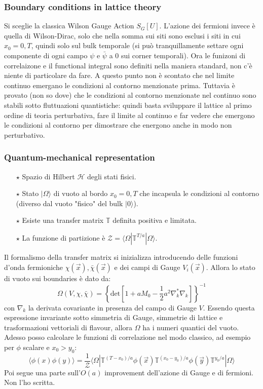 \documentclass[12pt,a4paper,openright]{article}
\newcommand{\la}{\langle}
\newcommand{\ra}{\rangle}
\newcommand{\colg}{\textcolor{PineGreen}}
\begin{document}
\subsubsection*{Boundary conditions in lattice theory}
Si sceglie la classica Wilson Gauge Action $S_G[U]$. L'azione dei fermioni invece è quella di Wilson-Dirac, solo che nella somma sui siti sono esclusi i siti in cui $x_0 = 0, T$, quindi solo sul bulk temporale
(si può tranquillamente settare ogni componente di ogni campo $\psi$ e $\bar\psi$ a 0 sui corner temporali).
Ora \colg{le funizoni di correlaizone e il functional integral sono definiti nella maniera standard, non c'è niente di particolare da fare}.
\newline
A questo punto non è scontato che nel limite continuo emergano le condizioni al contorno menzionate prima.
Tuttavia è provato (non so dove) che le condizioni al contorno menzionate nel continuo sono stabili sotto fluttuazioni quantistiche: quindi basta sviluppare il lattice al primo ordine di teoria perturbativa, fare il limite al continuo e far vedere che emergono le condizioni al contorno per dimostrare che energono anche in modo non perturbativo.

\subsubsection*{Quantum-mechanical representation}
\begin{itemize}
  \item [$\star$] Spazio di Hilbert $\mathcal{H}$ degli stati fisici.
  \item [$\star$] Stato $| \Omega \ra$ di vuoto al bordo $x_0 = 0,T$ che incapsula le condizioni al contorno (diverso dal vuoto "fisico" del bulk $| 0 \ra$).
  \item [$\star$] Esiste una transfer matrix $\mathbb{T}$ definita positiva e limitata.
  \item [$\star$] La funzione di partizione è $\mathcal{Z} = \la \Omega | \mathbb{T}^{T/a} | \Omega \ra$.
\end{itemize}
Il formalismo della transfer matrix si inizializza introducendo delle funzioni d'onda fermioniche $\chi (\vec x), \bar\chi (\vec x)$ e dei campi di Gauge $V_i (\vec x)$. Allora lo stato di vuoto sui boundaries è dato da:
\begin{equation*}
  \Omega (V, \chi, \bar\chi) = \left\{ \text{det} \left[1+aM_0-\frac{1}{2}a^2 \nabla_k^* \nabla_k\right] \right\}^{-1}
\end{equation*}
con $\nabla_k$ la derivata covariante in presenza del campo di Gauge $V$. Essendo questa espressione invariante sotto simmetria di Gauge, simmetrie di lattice e trasformazioni vettoriali di flavour, allora $\Omega$ ha i numeri quantici del vuoto.
Adesso posso calcolare le funzioni di correlazione nel modo classico, ad esempio per $\phi$ scalare e $x_0 > y_0$:
\begin{equation*}
  \la \phi (x) \phi (y) \ra = \frac{1}{\mathcal Z} \la \Omega | \mathbb{T}^{(T-x_0)/a} \phi (\vec x) \mathbb{T}^{(x_0-y_0)/a} \phi (\vec y) \mathbb{T}^{y_0/a} | \Omega \ra 
\end{equation*}
Poi segue una parte sull'$O(a)$ improvement dell'azione di Gauge e di fermioni. Non l'ho scritta.
\end{document}
